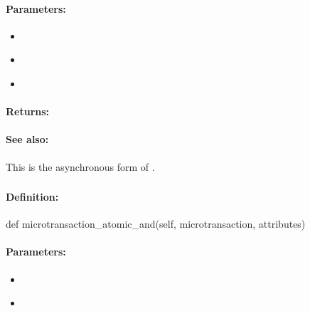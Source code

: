 \paragraph{Parameters:}
\begin{itemize}[noitemsep]
\item {}\\

\item {}\\

\item {}\\

\end{itemize}

\paragraph{Returns:}


\paragraph{See also:}  This is the asynchronous form of .

\pagebreak
\subsubsection{}
\label{api:python:microtransaction_atomic_and}


\paragraph{Definition:}
\begin{pythoncode}
def microtransaction_atomic_and(self, microtransaction, attributes)
\end{pythoncode}

\paragraph{Parameters:}
\begin{itemize}[noitemsep]
\item {}\\

\item {}\\

\end{itemize}

